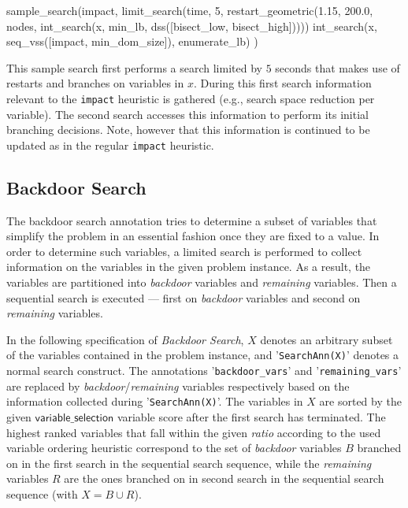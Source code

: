 \documentclass[a4paper]{article}
\newcommand{\fz}[1]{\texttt{#1}}
\newcommand{\fzsf}[1]{\ensuremath{\mathsf{#1}}}
\newcommand{\fzvarchoiceannotation}{\fzsf{variable\_selection}}
\newcommand{\vblabel}[1]	{\large\textbf{#1}}
\begin{document}
\begin{Zinc}[label={\vblabel{Example: Sample Search}}]
sample_search(impact,
    limit_search(time, 5,
        restart_geometric(1.15, 200.0, nodes,
            int_search(x, min_lb, dss([bisect_low, bisect_high]))))
    int_search(x, seq_vss([impact, min_dom_size]), enumerate_lb)
)
\end{Zinc}

This sample search first performs a search limited by $5$ seconds that makes
use of restarts and branches on variables in $x$.  During this first search
information relevant to the \texttt{impact} heuristic is gathered (e.g., search
space reduction per variable).  The second search accesses this information to
perform its initial branching decisions.  Note, however that this information
is continued to be updated as in the regular \texttt{impact} heuristic.


\subsection{Backdoor Search}

The backdoor search annotation tries to determine a subset of variables that
simplify the problem in an essential fashion once they are fixed to a value.
In order to determine such variables, a limited search is performed to collect
information on the variables in the given problem instance.  As a result, the
variables are partitioned into \emph{backdoor} variables and \emph{remaining}
variables.  Then a sequential search is executed --- first on \emph{backdoor}
variables and second on \emph{remaining} variables.

In the following specification of \emph{Backdoor Search}, $X$ denotes an
arbitrary subset of the variables contained in the problem instance, and
'\fz{SearchAnn(X)}' denotes a normal search construct.  The
annotations '\fz{backdoor\_vars}' and '\fz{remaining\_vars}' are replaced by
\emph{backdoor}/\emph{remaining} variables respectively based on the
information collected during '\fz{SearchAnn(X)}'.  The variables in $X$ are sorted
by the given \fzvarchoiceannotation{} variable score after the first search has
terminated.  The highest ranked variables that fall within the given
\emph{ratio} according to the used variable ordering heuristic correspond to
the set of \emph{backdoor} variables $B$ branched on in the first search in the
sequential search sequence, while the \emph{remaining} variables $R$ are the
ones branched on in second search in the sequential search sequence
(with $X = B \cup R$).
\end{document}

